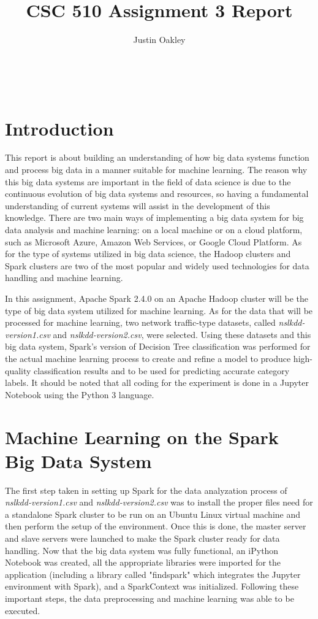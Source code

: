 \documentclass[a4paper,12pt]{IEEEtran}
\begin{document}
\title{CSC 510 Assignment 3 Report}
\author{Justin Oakley}
\maketitle\

\tableofcontents
\newpage

\section{Introduction}
This report is about building an understanding of how big data systems function and process big data in a manner suitable for machine learning. The reason why this big data systems are important in the field of data science is due to the continuous evolution of big data systems and resources, so having a fundamental understanding of current systems will assist in the development of this knowledge. There are two main ways of implementing a big data system for big data analysis and machine learning: on a local machine or on a cloud platform, such as Microsoft Azure, Amazon Web Services, or Google Cloud Platform. As for the type of systems utilized in big data science, the Hadoop clusters and Spark clusters are two of the most popular and widely used technologies for data handling and machine learning.

In this assignment, Apache Spark 2.4.0 on an Apache Hadoop cluster will be the type of big data system utilized for machine learning. As for the data that will be processed for machine learning, two network traffic-type datasets, called \textit{nslkdd-version1.csv} and \textit{nslkdd-version2.csv}, were selected. Using these datasets and this big data system, Spark's version of Decision Tree classification was performed for the actual machine learning process to create and refine a model to produce high-quality classification results and to be used for predicting accurate category labels. It should be noted that all coding for the experiment is done in a Jupyter Notebook using the Python 3 language.

\section{Machine Learning on the Spark Big Data System}
The first step taken in setting up Spark for the data analyzation process of \textit{nslkdd-version1.csv} and \textit{nslkdd-version2.csv} was to install the proper files need for a standalone Spark cluster to be run on an Ubuntu Linux virtual machine and then perform the setup of the environment. Once this is done, the master server and slave servers were launched to make the Spark cluster ready for data handling. Now that the big data system was fully functional, an iPython Notebook was created, all the appropriate libraries were imported for the application (including a library called "findspark" which integrates the Jupyter environment with Spark), and a SparkContext was initialized. Following these important steps, the data preprocessing and machine learning was able to be executed.
\end{document}
